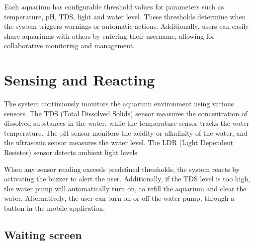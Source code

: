 \documentclass[11pt,a4paper]{article}
\begin{document}
\vspace{2em}
Each aquarium has configurable threshold values for parameters such as temperature, pH, TDS, light and water level. These thresholds determine when the system triggers warnings or automatic actions. Additionally, users can easily share aquariums with others by entering their username, allowing for collaborative monitoring and management.

\pagebreak

\section{Sensing and Reacting}

The system continuously monitors the aquarium environment using various sensors. The TDS (Total Dissolved Solids) sensor measures the concentration of dissolved substances in the water, while the temperature sensor tracks the water temperature. The pH sensor monitors the acidity or alkalinity of the water, and the ultrasonic sensor measures the water level. The LDR (Light Dependent Resistor) sensor detects ambient light levels.

When any sensor reading exceeds predefined thresholds, the system reacts by activating the buzzer to alert the user. Additionally, if the TDS level is too high, the water pump will automatically turn on, to refill the aquarium and clear the water. Alternatively, the user can turn on or off the water pump, through a button in the mobile application.

\subsection{Waiting screen}
\end{document}
